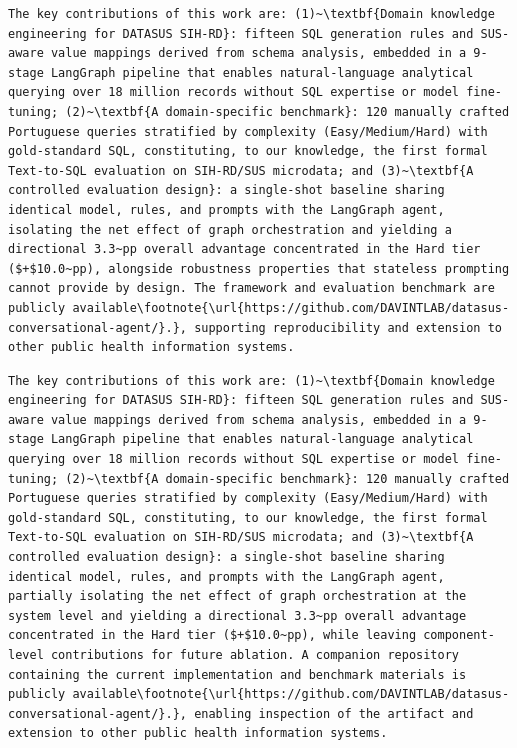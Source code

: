 \documentclass[11pt,a4paper]{article}
\begin{document}
\begin{originalblock}
\begin{lstlisting}[style=texsnippet]
The key contributions of this work are: (1)~\textbf{Domain knowledge engineering for DATASUS SIH-RD}: fifteen SQL generation rules and SUS-aware value mappings derived from schema analysis, embedded in a 9-stage LangGraph pipeline that enables natural-language analytical querying over 18 million records without SQL expertise or model fine-tuning; (2)~\textbf{A domain-specific benchmark}: 120 manually crafted Portuguese queries stratified by complexity (Easy/Medium/Hard) with gold-standard SQL, constituting, to our knowledge, the first formal Text-to-SQL evaluation on SIH-RD/SUS microdata; and (3)~\textbf{A controlled evaluation design}: a single-shot baseline sharing identical model, rules, and prompts with the LangGraph agent, isolating the net effect of graph orchestration and yielding a directional 3.3~pp overall advantage concentrated in the Hard tier ($+$10.0~pp), alongside robustness properties that stateless prompting cannot provide by design. The framework and evaluation benchmark are publicly available\footnote{\url{https://github.com/DAVINTLAB/datasus-conversational-agent/}.}, supporting reproducibility and extension to other public health information systems.
\end{lstlisting}
\end{originalblock}

\begin{finalblock}
\begin{lstlisting}[style=texsnippet]
The key contributions of this work are: (1)~\textbf{Domain knowledge engineering for DATASUS SIH-RD}: fifteen SQL generation rules and SUS-aware value mappings derived from schema analysis, embedded in a 9-stage LangGraph pipeline that enables natural-language analytical querying over 18 million records without SQL expertise or model fine-tuning; (2)~\textbf{A domain-specific benchmark}: 120 manually crafted Portuguese queries stratified by complexity (Easy/Medium/Hard) with gold-standard SQL, constituting, to our knowledge, the first formal Text-to-SQL evaluation on SIH-RD/SUS microdata; and (3)~\textbf{A controlled evaluation design}: a single-shot baseline sharing identical model, rules, and prompts with the LangGraph agent, partially isolating the net effect of graph orchestration at the system level and yielding a directional 3.3~pp overall advantage concentrated in the Hard tier ($+$10.0~pp), while leaving component-level contributions for future ablation. A companion repository containing the current implementation and benchmark materials is publicly available\footnote{\url{https://github.com/DAVINTLAB/datasus-conversational-agent/}.}, enabling inspection of the artifact and extension to other public health information systems.
\end{lstlisting}
\end{finalblock}
\end{document}
